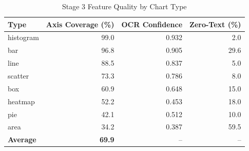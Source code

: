 \begin{table}[htbp]
\centering
\caption{Stage 3 Feature Quality by Chart Type}
\label{tab:stage3-quality}
\begin{tabular}{@{}lrrr@{}}
\toprule
\textbf{Type} & \textbf{Axis Coverage (\%)} & \textbf{OCR Confidence} & \textbf{Zero-Text (\%)} \\
\midrule
histogram & 99.0 & 0.932 &  2.0 \\
bar       & 96.8 & 0.905 & 29.6 \\
line      & 88.5 & 0.837 &  5.0 \\
scatter   & 73.3 & 0.786 &  8.0 \\
box       & 60.9 & 0.648 & 15.0 \\
heatmap   & 52.2 & 0.453 & 18.0 \\
pie       & 42.1 & 0.512 & 10.0 \\
area      & 34.2 & 0.387 & 59.5 \\
\midrule
\textbf{Average} & \textbf{69.9} & -- & -- \\
\bottomrule
\end{tabular}
\end{table}